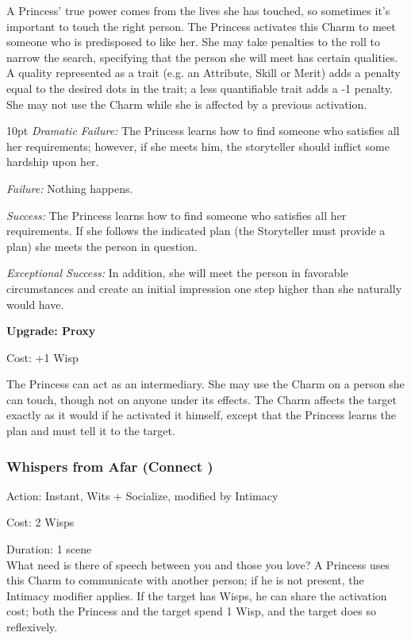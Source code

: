 \noindent A Princess' true power comes from the lives she has touched, so sometimes it's important to touch the right person. The Princess activates this Charm to meet someone who is predisposed to like her. She may take penalties to the roll to narrow the search, specifying that the person she will meet has certain qualities. A quality represented as a trait (e.g. an Attribute, Skill or Merit) adds a penalty equal to the desired dots in the trait; a less quantifiable trait adds a -1 penalty. She may not use the Charm while she is affected by a previous activation.

\begin{myindentpar}{10pt}
    \emph{Dramatic Failure:} The Princess learns how to find someone who satisfies all her requirements; however, if she meets him, the storyteller should inflict some hardship upon her.
    
    \emph{Failure:} Nothing happens. 
    
    \emph{Success:} The Princess learns how to find someone who satisfies all her requirements. If she follows the indicated plan (the Storyteller must provide a plan) she meets the person in question.
    
    \emph{Exceptional Success:} In addition, she will meet the person in favorable circumstances and create an initial impression one step higher than she naturally would have.
    
    \textbf{Upgrade: Proxy}
    
    Cost: +1 Wisp 
    
    The Princess can act as an intermediary. She may use the Charm on a person she can touch, though not on anyone under its effects. The Charm affects the target exactly as it would if he activated it himself, except that the Princess learns the plan and must tell it to the target.    
\end{myindentpar}

\subsubsection*{Whispers from Afar (Connect \textbullet\textbullet\textbullet)}

\noindent Action: Instant, Wits + Socialize, modified by Intimacy

\noindent Cost: 2 Wisps

\noindent Duration: 1 scene \\

\noindent What need is there of speech between you and those you love? A Princess uses this Charm to communicate with another person; if he is not present, the Intimacy modifier applies. If the target has Wisps, he can share the activation cost; both the Princess and the target spend 1 Wisp, and the target does so reflexively. \\



